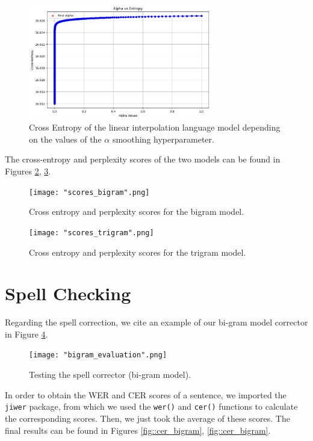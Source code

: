 \documentclass[11pt, a4paper]{article}
\begin{document}
	
	\begin{figure}
		\centering
		\includegraphics[width=8cm]{"interpolation_alpha.png"}
		\caption{Cross Entropy of the linear interpolation language model depending on the values of the $\alpha$ smoothing hyperparameter.}
		\label{fig::li_alpha_entropy}
	\end{figure}


	The cross-entropy and perplexity scores of the two models can be found in Figures \ref{fig::scores_bigram}, \ref{fig::scores_trigram}.

	\begin{figure}
	    \centering
	    \texttt{[image: "scores\_bigram".png]}
	    \caption{Cross entropy and perplexity scores for the bigram model.}
	    \label{fig::scores_bigram}
	\end{figure}
	
	\begin{figure}
	    \centering
	    \texttt{[image: "scores\_trigram".png]}
	    \caption{Cross entropy and perplexity scores for the trigram model.}
	    \label{fig::scores_trigram}
	\end{figure}


	
	\section{Spell Checking}
	
	
	Regarding the spell correction, we cite an example of our bi-gram model corrector in Figure \ref{fig::spell_check_example}.
	
	 \begin{figure}
	    \centering
	    \texttt{[image: "bigram\_evaluation".png]}
	    \label{fig::spell_check_example}
	    \caption{Testing the spell corrector (bi-gram model).}
	\end{figure}
 
	In order to obtain the WER and CER scores of a sentence, we imported the \texttt{jiwer} package, from which we used the \texttt{wer()} and \texttt{cer()} functions to calculate the corresponding scores. Then, we just took the average of these scores. The final results can be found in Figures \ref{fig::cer_bigram}, \ref{fig::cer_bigram}.
	
\end{document}
